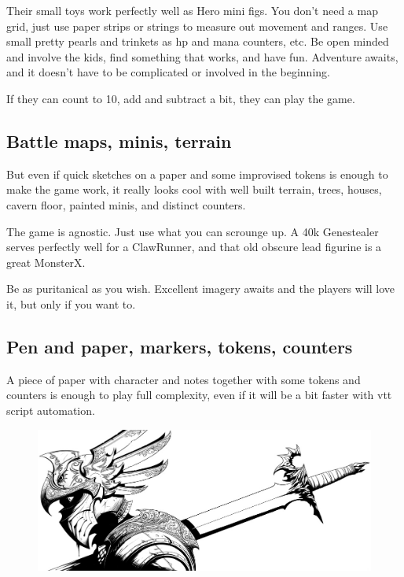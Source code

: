 Their small toys work perfectly well as Hero mini figs. You don't need a map grid, just use paper strips or strings to measure out movement and ranges. Use small pretty pearls and trinkets as hp and mana counters, etc. Be open minded and involve the kids, find something that works, and have fun. Adventure awaits, and it doesn't have to be complicated or involved in the beginning.

If they can count to 10, add and subtract a bit, they can play the game.


\subsection*{Battle maps, minis, terrain}

But even if quick sketches on a paper and some improvised tokens is enough to make the game work, it really looks cool with well built terrain, trees, houses, cavern floor, painted minis, and distinct counters.

The game is agnostic. Just use what you can scrounge up. A 40k Genestealer serves perfectly well for a ClawRunner, and that old obscure lead figurine is a great MonsterX.

Be as puritanical as you wish. Excellent imagery awaits and the players will love it, but only if you want to.


\subsection*{Pen and paper, markers, tokens, counters}

A piece of paper with character and notes together with some tokens and counters is enough to play full complexity, even if it will be a bit faster with vtt script automation.


\begin{figure}[b]
\centering
\includegraphics[width=120mm]{./fig/deadhero.jpg}
\end{figure}








